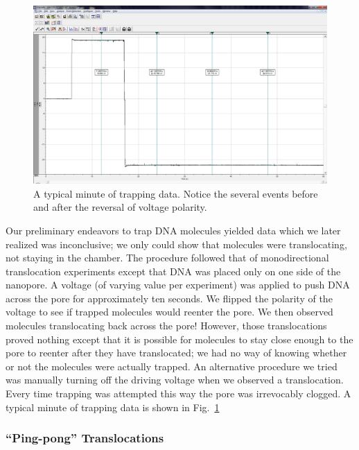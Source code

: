 \documentclass[aps,prl,preprint,groupedaddress]{revtex4}
\begin{document}
\begin{figure}
\centering
\includegraphics[width=1\textwidth]{figures/trapping-minute}
\caption{A typical minute of trapping data.
Notice the several events before and after the reversal of voltage polarity.}
\label{fig:trapping-data}
\end{figure}

Our preliminary endeavors to trap DNA molecules yielded data which we later realized was inconclusive; we only could show that molecules were translocating, not staying in the chamber.
The procedure followed that of monodirectional translocation experiments except that DNA was placed only on one side of the nanopore.
A voltage (of varying value per experiment) was applied to push DNA across the pore for approximately ten seconds.
We flipped the polarity of the voltage to see if trapped molecules would reenter the pore.
We then observed molecules translocating back across the pore!
However, those translocations proved nothing except that it is possible for molecules to stay close enough to the pore to reenter after they have translocated; we had no way of knowing whether or not the molecules were actually trapped.
An alternative procedure we tried was manually turning off the driving voltage when we observed a translocation.
Every time trapping was attempted this way the pore was irrevocably clogged.
A typical minute of trapping data is shown in Fig.~\ref{fig:trapping-data}

\subsubsection{``Ping-pong'' Translocations}
\end{document}
